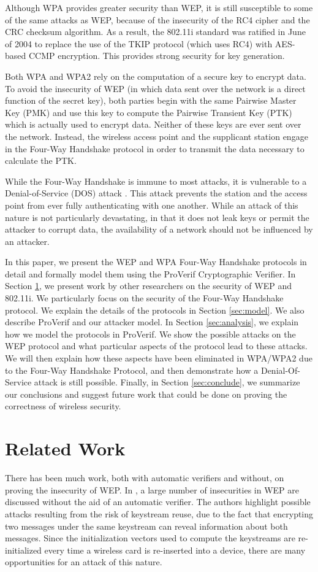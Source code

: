 \documentclass[11pt, twocolumn]{article} %
\begin{document}
Although WPA provides greater security than WEP, it is still susceptible to some of the same attacks as WEP, because of the insecurity of the RC4 cipher and the CRC checksum algorithm.  As a result, the 802.11i standard was ratified in June of 2004 to replace the use of the TKIP protocol (which uses RC4) with AES-based CCMP encryption\cite{IEEE802.11i}. This provides strong security for key generation.

Both WPA and WPA2 rely on the computation of a secure key to encrypt data.  To avoid the insecurity of WEP (in which data sent over the network is a direct function of the secret key), both parties begin with the same Pairwise Master Key (PMK) and use this key to compute the Pairwise Transient Key (PTK) which is actually used to encrypt data.  Neither of these keys are ever sent over the network.  Instead, the wireless access point and the supplicant station engage in the Four-Way Handshake protocol in order to transmit the data necessary to calculate the PTK.  

While the Four-Way Handshake is immune to most attacks, it is vulnerable to a Denial-of-Service (DOS) attack \cite{he05}.  This attack prevents the station and the access point from ever fully authenticating with one another.  While an attack of this nature is not particularly devastating, in that it does not leak keys or permit the attacker to corrupt data, the availability of a network should not be influenced by an attacker.

In this paper, we present the WEP and WPA Four-Way Handshake protocols in detail and formally model them using the ProVerif Cryptographic Verifier. In Section \ref{sec:Related Work}, we present work by other researchers on the security of WEP and 802.11i.  We particularly focus on the security of the Four-Way Handshake protocol.  We explain the details of the protocols in Section \ref{sec:model}.  We also describe ProVerif and our attacker model.  In Section \ref{sec:analysis}, we explain how we model the protocols in ProVerif.  We show the possible attacks on the WEP protocol and what particular aspects of the protocol lead to these attacks.  We will then explain how these aspects have been eliminated in WPA/WPA2 due to the Four-Way Handshake Protocol, and then demonstrate how a Denial-Of-Service attack is still possible.  Finally, in Section \ref{sec:conclude}, we summarize our conclusions and suggest future work that could be done on proving the correctness of wireless security.
\section{Related Work}
\label{sec:Related Work}
There has been much work, both with automatic verifiers and without, on proving the insecurity of WEP.  In \cite{borisov01}, a large number of insecurities in WEP are discussed without the aid of an automatic verifier.  The authors highlight possible attacks resulting from the risk of keystream reuse, due to the fact that encrypting two messages under the same keystream can reveal information about both messages.  Since the initialization vectors used to compute the keystreams are re-initialized every time a wireless card is re-inserted into a device, there are many opportunities for an attack of this nature.  
\end{document}
